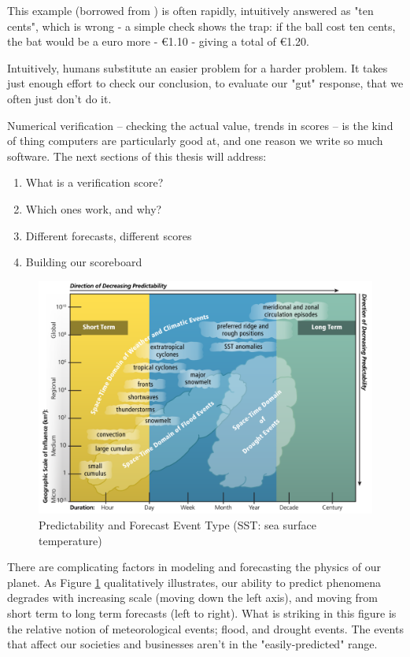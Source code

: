 \documentclass[logos,parttoc,morelanguage=french,morelanguage=german,draft]{orsay-memoire}
\begin{document}
This example (borrowed from \textcite{kahneman2011thinking}) is often rapidly, intuitively answered as "ten cents", which is wrong - a simple check shows the trap: if the ball cost ten cents, the bat would be a euro more - €1.10 - giving a total of €1.20.

Intuitively, humans substitute an easier problem for a harder problem. It takes just enough effort to check our conclusion, to evaluate our "gut" response, that we often just don't do it.

Numerical verification -- checking the actual value, trends in scores -- is the kind of thing computers are particularly good at, and one reason we write so much software. The next sections of this thesis will address:
\begin{enumerate}
\item What is a verification score?
\item Which ones work, and why?
\item Different forecasts, different scores
\item Building our scoreboard
\end{enumerate}

\begin{figure}[hb]
\includegraphics[width=\linewidth]{images/noaaSeasonalForecastProbs.png}
  \caption{Predictability and Forecast Event Type (SST: sea surface temperature) \autocite{jones2015cdwrproceedings}}
  \label{fig:noaa_seasonal_predictability}
\end{figure}

There are complicating factors in modeling and forecasting the physics of our planet. As Figure \ref{fig:noaa_seasonal_predictability} qualitatively illustrates, our ability to predict phenomena degrades with increasing scale (moving down the left axis), and moving from short term to long term forecasts (left to right). What is striking in this figure is the relative notion of meteorological events; flood, and drought events. The events that affect our societies and businesses aren't in the "easily-predicted" range.
\end{document}
